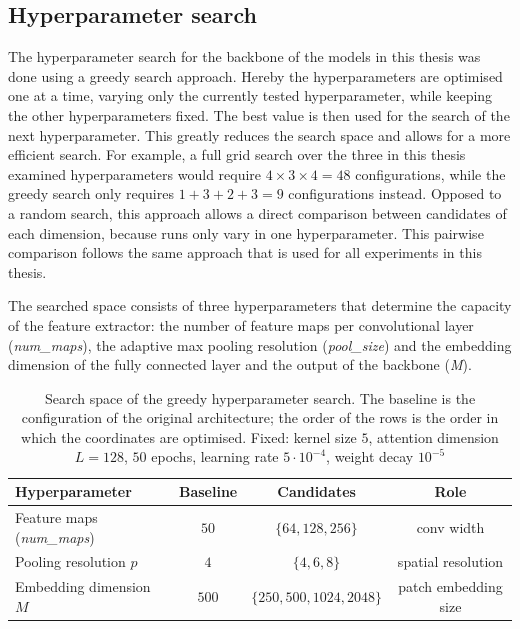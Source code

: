 \documentclass[12pt,parskip = half, DIV=classic,listof=totoc]{scrartcl}
\begin{document}
		\subsection{Hyperparameter search}\label{sec:greedy}
			The hyperparameter search for the backbone of the models in this thesis was done using a greedy search approach. 
			Hereby the hyperparameters are optimised one at a time, varying only the currently tested hyperparameter, while keeping the other hyperparameters fixed. 
			The best value is then used for the search of the next hyperparameter. This greatly reduces the search space and allows for a more
			efficient search. For example, a full grid search over the three in this thesis examined hyperparameters would require $4\times3\times4 = 48$ 
			configurations, while the greedy search only requires $1+3+2+3=9$ configurations instead. Opposed to a random search,
			this approach allows a direct comparison between candidates of each dimension, because runs only vary in one hyperparameter. 
			This pairwise comparison follows the same approach that is used for all experiments in this thesis.



			The searched space consists of three hyperparameters that determine the capacity of the feature extractor: the number of 
			feature maps per convolutional layer (\textit{num\_maps}), the adaptive max pooling resolution (\textit{pool\_size}) and the 
			embedding dimension of the fully connected layer and the output of the backbone (\textit{M}). 

			\begin{table}[htbp]
				\centering
				\small
				\begin{tabular}{@{}lccc@{}}
					\toprule
					Hyperparameter & Baseline & Candidates & Role \\
					\midrule
					Feature maps (\textit{num\_maps}) & $50$  & $\{64, 128, 256\}$          & conv width \\
					Pooling resolution $p$            & $4$   & $\{4, 6, 8\}$               & spatial resolution \\
					Embedding dimension $M$           & $500$ & $\{250, 500, 1024, 2048\}$  & patch embedding size \\
					\bottomrule
				\end{tabular}
				\caption[Search space of the greedy hyperparameter search]{Search space of the greedy hyperparameter search. The baseline is the
				configuration of the original architecture; the order of the rows is the order
				in which the coordinates are optimised. Fixed: kernel size $5$, attention dimension $L=128$, $50$ epochs,
					learning rate $5\cdot10^{-4}$, weight decay $10^{-5}$}
				\label{tab:greedy-space}

			\end{table}
\end{document}
